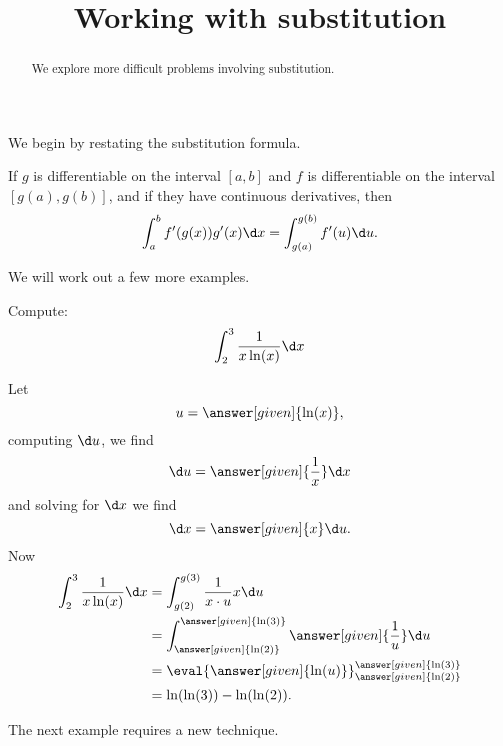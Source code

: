 \documentclass{ximera}
\title[Dig-In:]{Working with substitution}
\begin{document}
\begin{abstract}
We explore more difficult problems involving substitution.
\end{abstract}
\maketitle

We begin by restating the substitution formula.

\begin{theorem} 
If $g$ is differentiable on the interval $[a,b]$ and $f$ is
differentiable on the interval $[g(a),g(b)]$, and if they have continuous derivatives, then
\[
\int_a^b f'(g(x)) g'(x) \d x =\int_{g(a)}^{g(b)} f'(u) \d u.
\]
\end{theorem}


We will work out a few more examples.


\begin{example}
Compute:
\[
\int_{2}^{3} \frac{1}{x\ln(x)} \d x
\]
\begin{explanation}
  Let
  \[
  u =\answer[given]{\ln(x)},
  \]
  computing $\d u$, we find
  \[
  \d u =\answer[given]{\frac{1}{x}}\d x
  \]
  and solving for $\d x$ we find
  \[
  \d x = \answer[given]{x} \d u.
  \]
  Now
\begin{align*}
\int_{2}^{3} \frac{1}{x\ln(x)} \d x &= \int_{g(2)}^{g(3)} \frac{1}{x \cdot u} x \d u  \\
&= \int_{\answer[given]{\ln(2)}}^{\answer[given]{\ln(3)}} \answer[given]{\frac{1}{u}} \d u\\
&= \eval{\answer[given]{\ln(u)}}_{\answer[given]{\ln(2)}}^{\answer[given]{\ln(3)}}\\
& = \ln(\ln(3)) - \ln(\ln(2)).
\end{align*}
\end{explanation}
\end{example}


The next example requires a new technique.
\end{document}
